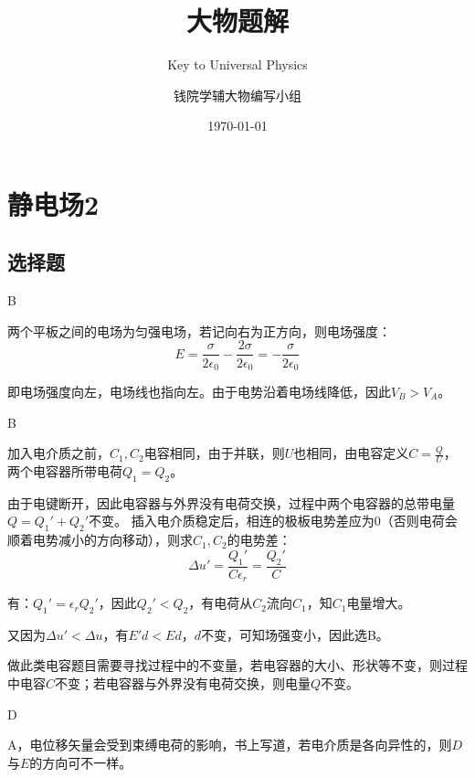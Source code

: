 \documentclass[b5paper,opensource]{qyxf-book}
\title{大物题解}
\subtitle{Key to Universal Physics}
\author{钱院学辅大物编写小组}
\date{\today}
\begin{document}
\tableofcontents

\chapter{静电场2}  %
\section{选择题}  %

B  %

\solve  %
两个平板之间的电场为匀强电场，若记向右为正方向，则电场强度：
\[E=\frac{\sigma}{2\epsilon_0}-\frac{2\sigma}{2\epsilon_0}=-\frac{\sigma}{2\epsilon_0}\]

即电场强度向左，电场线也指向左。由于电势沿着电场线降低，因此$V_B>V_A$。

B

\solve 加入电介质之前，$ C_1,C_2 $电容相同，由于并联，则$ U $也相同，由电容定义$ C=\frac{Q}{U} $，两个电容器所带电荷$ Q_1=Q_2 $。

由于电键断开，因此电容器与外界没有电荷交换，过程中两个电容器的总带电量$ Q=Q_1'+Q_2' $不变。
插入电介质稳定后，相连的极板电势差应为$ 0 $（否则电荷会顺着电势减小的方向移动），则求$ C_1,C_2 $的电势差：
\[\Delta u'=\frac{Q_1'}{C\epsilon_r}=\frac{Q_2'}{C}\]

有：$Q_1'=\epsilon_r Q_2'$，因此$Q_2'<Q_2$，有电荷从$C_2$流向$C_1$，知$C_1$电量增大。

又因为$\Delta u'<\Delta u$，有$E'd<Ed$，$d$不变，可知场强变小，因此选B。

\note 做此类电容题目需要寻找过程中的不变量，若电容器的大小、形状等不变，则过程中电容$ C $不变；若电容器与外界没有电荷交换，则电量$ Q $不变。

D

\solve A，电位移矢量会受到束缚电荷的影响，书上写道，若电介质是各向异性的，则$ D $与$ E $的方向可不一样。
\end{document}
